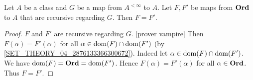 \documentclass[../../set-theory/set-theory.tex]{subfiles}
\begin{document}
  \begin{forthel}
    \begin{theorem}
      Let $A$ be a class and $G$ be a map from $A^{< \infty}$ to $A$.
      Let $F, F'$ be maps from $\mathbf{Ord}$ to $A$ that are recursive regarding $G$.
      Then $F = F'$.
    \end{theorem}
    \begin{proof}
      $F$ and $F'$ are recursive regarding $G$.
      [prover vampire]
      Then $F(\alpha) = F'(\alpha)$ for all $\alpha \in \operatorname{dom}(F) \cap \operatorname{dom}(F')$
      (by \cref{SET_THEORY_04_2876133366300672}).
      Indeed let $\alpha \in \operatorname{dom}(F) \cap \operatorname{dom}(F')$. %
      We have $\operatorname{dom}(F) = \mathbf{Ord} = \operatorname{dom}(F')$.
      Hence $F(\alpha) = F'(\alpha)$ for all $\alpha \in \mathbf{Ord}$.
      Thus $F = F'$.
    \end{proof}
  \end{forthel}
\end{document}
